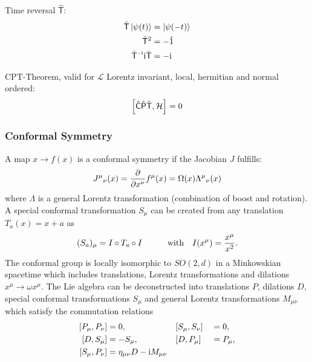 			\noindent
			Time reversal $\hat{\mathsf{T}}$:
			\begin{equation}
				\begin{aligned}
					\hat{\mathsf{T}} \Ket{\psi(t)} &= \Ket{\psi(-t)} \\
					\hat{\mathsf{T}}^2 &= - \hat{1} \\
					\inv{\hat{\mathsf{T}}} \i \hat{\mathsf{T}} &= -\i \\
				\end{aligned}
			\end{equation}

			\noindent
			CPT-Theorem, valid for $\mathcal{L}$ Lorentz invariant, local, hermitian and normal ordered:
			\begin{equation}
				\comm{\hat{\mathsf{C}}\hat{\mathsf{P}}\hat{\mathsf{T}}}{\mathcal{H}} = 0
			\end{equation}


		\subsubsection{Conformal Symmetry}
		A map $x\to f(x)$ is a conformal symmetry if the Jacobian $J$ fulfills:
		\begin{equation}
			J^\mu{}_\nu(x) = \pdv{x^\nu} f^\mu(x) = \Omega(x) \Lambda^\mu{}_\nu(x)
		\end{equation}
		where $\Lambda$ is a general Lorentz transformation (\ie combination of boost and rotation).
		A special conformal transformation $S_\mu$ can be created from any translation $T_a(x) = x+a$ as 
		\begin{equation}
			(S_a)_{\mu} = I\circ T_a \circ I \hspace{30pt}\text{with}\quad I(x^\mu) = \frac{x^\mu}{x^2}.
		\end{equation}
		The conformal group is locally isomorphic to $SO(2,d)$ in a Minkowskian spacetime which includes translations, Lorentz transformations and dilations $x^\mu \to \omega x^\mu$. The Lie algebra can be deconstructed into translations $P$, dilations $D$, special conformal transformations $S_\mu$ and general Lorentz transformations $M_{\mu\nu}$ which satisfy the commutation relations
		\begin{alignat}{3}
			\comm{P_\mu}{P_\nu} &= 0,\hsp&&\comm{S_\mu}{S_\nu} &&= 0, \\
			\comm{D}{S_\mu} &= - S_\mu,\hsp&& \comm{D}{P_\mu} &&= P_\mu, \\
			\comm{S_\mu}{P_\nu} &= \eta_{\mu\nu} D - \i M_{\mu\nu}
		\end{alignat}


